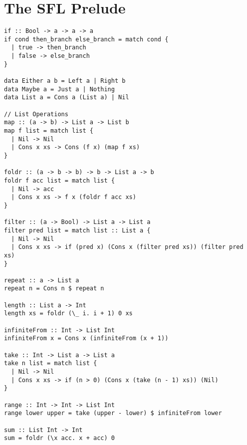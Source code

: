 \chapter{The SFL Prelude}
\label{appx:prelude}
\begin{lstlisting}[language=SFL]
if :: Bool -> a -> a -> a
if cond then_branch else_branch = match cond {
  | true -> then_branch
  | false -> else_branch
}

data Either a b = Left a | Right b
data Maybe a = Just a | Nothing
data List a = Cons a (List a) | Nil

// List Operations
map :: (a -> b) -> List a -> List b
map f list = match list {
  | Nil -> Nil
  | Cons x xs -> Cons (f x) (map f xs)
}

foldr :: (a -> b -> b) -> b -> List a -> b
foldr f acc list = match list {
  | Nil -> acc
  | Cons x xs -> f x (foldr f acc xs)
}

filter :: (a -> Bool) -> List a -> List a
filter pred list = match list :: List a {
  | Nil -> Nil
  | Cons x xs -> if (pred x) (Cons x (filter pred xs)) (filter pred xs)
}

repeat :: a -> List a
repeat n = Cons n $ repeat n

length :: List a -> Int
length xs = foldr (\_ i. i + 1) 0 xs

infiniteFrom :: Int -> List Int
infiniteFrom x = Cons x (infiniteFrom (x + 1))

take :: Int -> List a -> List a
take n list = match list {
  | Nil -> Nil
  | Cons x xs -> if (n > 0) (Cons x (take (n - 1) xs)) (Nil)
}

range :: Int -> Int -> List Int
range lower upper = take (upper - lower) $ infiniteFrom lower

sum :: List Int -> Int
sum = foldr (\x acc. x + acc) 0
\end{lstlisting}